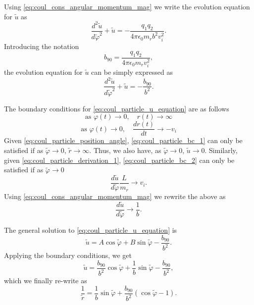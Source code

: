 \documentclass[a4paper,11pt]{report}
\begin{document}
Using \cref{eq:coul_cons_angular_momentum_mag} we write the evolution equation for $\tilde{u}$ as
\begin{equation}
    \frac{d^2 \tilde{u}}{d \tilde{\varphi}^2} + \tilde{u} = -\frac{q_1 q_2}{4 \pi \epsilon_0 m_r b^2 v_i^2}.
\end{equation}
Introducing the notation
\begin{equation}
    \label{eq:coul_b90}
    b_{90} = \frac{q_1 q_2}{4 \pi \epsilon_0 m_r v_i^2},
\end{equation}
the evolution equation for $\tilde{u}$ can be simply expressed as
\begin{equation}
    \label{eq:coul_particle_u_equation}
    \frac{d^2 \tilde{u}}{d \tilde{\varphi}^2} + \tilde{u} = -\frac{b_{90}}{b^2}.
\end{equation}

The boundary conditions for \cref{eq:coul_particle_u_equation} are as follows
\begin{equation}
    \label{eq:coul_particle_bc_1}
    \text{as } \varphi(t) \to 0, \quad r(t) \to \infty
\end{equation}
\begin{equation}
    \label{eq:coul_particle_bc_2}
    \text{as } \varphi(t) \to 0, \quad \frac{dr(t)}{dt} \to -v_i
\end{equation}
Given \cref{eq:coul_particle_position_angle}, \cref{eq:coul_particle_bc_1} can only be satisfied if as $\tilde{\varphi} \to 0$, $\tilde{r} \to \infty$. Thus, we also have, as $\tilde{\varphi} \to 0$, $\tilde{u} \to 0$. Similarly, given \cref{eq:coul_particle_derivation_1}, \cref{eq:coul_particle_bc_2} can only be satisfied if as $\tilde{\varphi} \to 0$
\begin{equation*}
    \frac{d\tilde{u}}{d\tilde{\varphi}} \frac{L}{m_r} \to v_i.
\end{equation*}
Using \cref{eq:coul_cons_angular_momentum_mag} we rewrite the above as 
\begin{equation*}
    \frac{d\tilde{u}}{d\tilde{\varphi}} \to \frac{1}{b}.
\end{equation*}

The general solution to \cref{eq:coul_particle_u_equation} is 
\begin{equation*}
    \tilde{u} = A \cos \tilde{\varphi} + B \sin \tilde{\varphi} - \frac{b_{90}}{b^2}.
\end{equation*}
Applying the boundary conditions, we get
\begin{equation*}
    \tilde{u} = \frac{b_{90}}{b^2} \cos \tilde{\varphi} + \frac{1}{b} \sin \tilde{\varphi} - \frac{b_{90}}{b^2},
\end{equation*}
which we finally re-write as
\begin{equation}
    \label{eq:coul_trajectory_eq}
    \frac{1}{\tilde{r}} = \frac{1}{b} \sin \tilde{\varphi} + \frac{b_{90}}{b^2} \left ( \cos \tilde{\varphi} - 1 \right ).
\end{equation}
\end{document}
